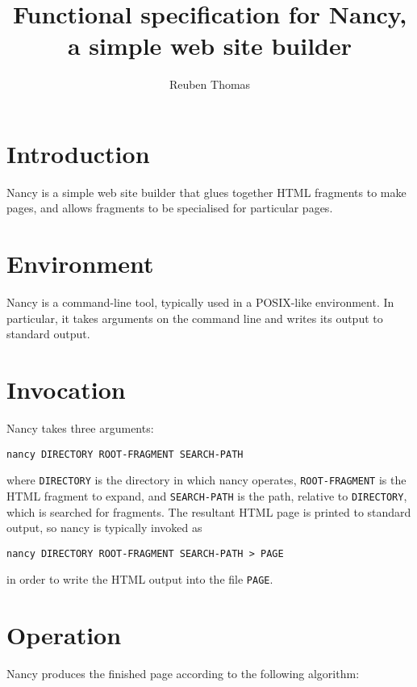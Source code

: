 \documentclass[english]{scrartcl}
\begin{document}
\title{Functional specification for Nancy, a simple web site builder}
\date{\relax}
\author{Reuben Thomas}
\maketitle

\section{Introduction}

Nancy is a simple web site builder that glues together HTML fragments
to make pages, and allows fragments to be specialised for particular
pages.

\section{Environment}

Nancy is a command-line tool, typically used in a POSIX-like
environment. In particular, it takes arguments on the command line and
writes its output to standard output.

\section{Invocation}

Nancy takes three arguments:

\begin{verbatim}
nancy DIRECTORY ROOT-FRAGMENT SEARCH-PATH
\end{verbatim}

where \texttt{DIRECTORY} is the directory in which nancy operates,
\texttt{ROOT-FRAGMENT} is the HTML fragment to expand, and
\texttt{SEARCH-PATH} is the path, relative to \texttt{DIRECTORY},
which is searched for fragments. The resultant HTML page is printed to
standard output, so nancy is typically invoked as

\begin{verbatim}
nancy DIRECTORY ROOT-FRAGMENT SEARCH-PATH > PAGE
\end{verbatim}

in order to write the HTML output into the file \texttt{PAGE}.

\section{Operation}
\label{operation}

Nancy produces the finished page according to the following algorithm:
\end{document}
